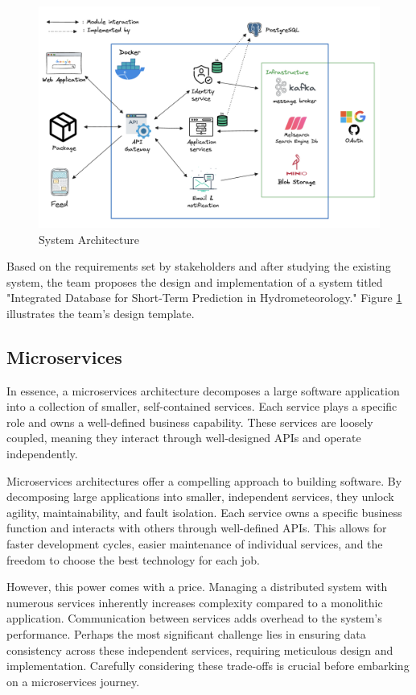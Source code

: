 \begin{figure}[H]
    \centering
    \includegraphics[width=\linewidth]{Images/arch.png}
    \vspace{1em}
    \caption{System Architecture}
    \label{fig:sow}
\end{figure}
\vspace{0.5cm}
Based on the requirements set by stakeholders and after studying the existing
system, the team proposes the design and implementation of a system titled
"Integrated Database for Short-Term Prediction in Hydrometeorology." Figure
\ref{fig:sow} illustrates the team's design template.
\newpage

\subsection{Microservices}

In essence, a microservices architecture decomposes a large software application
into a collection of smaller, self-contained services. Each service plays a
specific role and owns a well-defined business capability. These services are
loosely coupled, meaning they interact through well-designed APIs and operate independently.

Microservices architectures offer a compelling approach to building software. By
decomposing large applications into smaller, independent services, they unlock
agility, maintainability, and fault isolation.  Each service owns a specific
business function and interacts with others through well-defined APIs. This
allows for faster development cycles, easier maintenance of individual services,
and the freedom to choose the best technology for each job.

However, this power comes with a price. Managing a distributed system with
numerous services inherently increases complexity compared to a monolithic
application. Communication between services adds overhead to the system's
performance. Perhaps the most significant challenge lies in ensuring data
consistency across these independent services, requiring meticulous design and
implementation.  Carefully considering these trade-offs is crucial before
embarking on a microservices journey.

